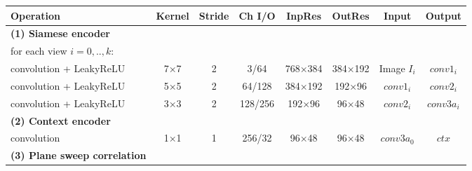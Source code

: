 \begin{table}[htbp]
\scriptsize
\centering
\begin{adjustbox}{width=1\textwidth}
\def\arraystretch{1.45}
\begin{tabular}{|l|c|c|c|c|c|c|c|}
\hline
\rowcolor{bgcolor}
\textbf{Operation}                     & \textbf{Kernel} & \textbf{Stride} & \textbf{Ch I/O} & \textbf{InpRes} & \textbf{OutRes} & \textbf{Input}     & \textbf{Output} \\ \hline
\hline
\rowcolor{bgcolor}
\textbf{(1) Siamese encoder}           &                 &                 &                 &                 &                 &                    &                 \\ \hline
for each view $i = 0, .., k:$            &                 &                 &                 &                 &                 &                    &                 \\ \hline
\hspace{0.75cm}convolution + LeakyReLU                            & 7×7             & 2               & 3/64            & 768×384         & 384×192         & Image $I_i$           & $conv1_i$          \\ \hline
\hspace{0.75cm}convolution + LeakyReLU                            & 5×5             & 2               & 64/128          & 384×192         & 192×96          & $conv1_i$             & $conv2_i$          \\ \hline
\hspace{0.75cm}convolution + LeakyReLU                           & 3×3             & 2               & 128/256         & 192×96          & 96×48           & $conv2_i$             & $conv3a_i$         \\ \hline
\hline
\rowcolor{bgcolor}
\textbf{(2) Context encoder}           &                 &                 &                 &                 &                 &                    &                 \\ \hline
convolution                            & 1×1             & 1               & 256/32          & 96×48           & 96×48           & $conv3a_0$            & $ctx$             \\ \hline
\hline
\rowcolor{bgcolor}
\textbf{(3) Plane sweep correlation}   &                 &                 &                 &                 &                 &                    &                 \\ \hline

\end{tabular}
\end{adjustbox}
\end{table}
